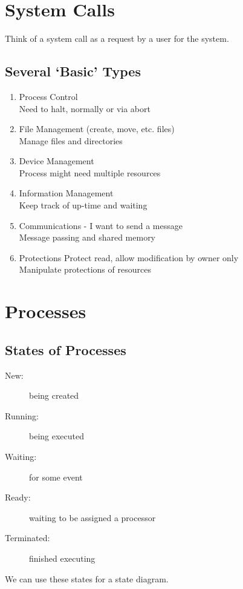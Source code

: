 \documentclass{article}
\begin{document}
\section*{System Calls}
Think of a system call as a request by a user for the system.
\subsection*{Several `Basic' Types}
\begin{enumerate}
      \item Process Control \\
            Need to halt, normally or via abort
      \item File Management (create, move, etc. files) \\
            Manage files and directories
      \item Device Management \\
            Process might need multiple resources
      \item Information Management \\
            Keep track of up-time and waiting
      \item Communications - I want to send a message \\
            Message passing and shared memory
      \item Protections Protect read, allow modification by owner only \\
            Manipulate protections of resources
\end{enumerate}

\section*{Processes}
\subsection*{States of Processes}
\begin{description}
      \item [New:] being created
      \item [Running:] being executed
      \item [Waiting:] for some event
      \item [Ready:] waiting to be assigned a processor
      \item [Terminated:] finished executing
\end{description}

We can use these states for a state diagram.
\end{document}
